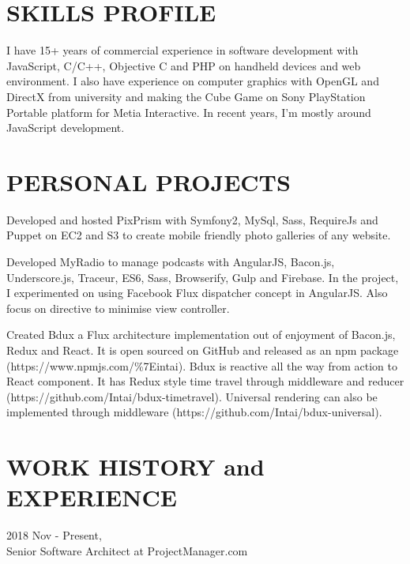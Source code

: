 \begin{resume}
\vspace{0.1in}
 
\section{SKILLS PROFILE} 
\vspace{0.1in}

I have 15+ years of commercial experience in software development with JavaScript, C/C++, Objective C and PHP on handheld devices and web environment. I also have experience on computer graphics with OpenGL and DirectX from university and making the Cube Game on Sony PlayStation Portable platform for Metia Interactive. In recent years, I'm mostly around JavaScript development.

\section{PERSONAL PROJECTS} 
\vspace{0.1in}

Developed and hosted PixPrism with Symfony2, MySql, Sass, RequireJs and Puppet on EC2 and S3 to create mobile friendly photo galleries of any website.

Developed MyRadio to manage podcasts with AngularJS, Bacon.js, Underscore.js, Traceur, ES6, Sass, Browserify, Gulp and Firebase. In the project, I experimented on using Facebook Flux dispatcher concept in AngularJS. Also focus on directive to minimise view controller.

Created Bdux a Flux architecture implementation out of enjoyment of Bacon.js, Redux and React. It is open sourced on GitHub and released as an npm package (https://www.npmjs.com/\%7Eintai). Bdux is reactive all the way from action to React component. It has Redux style time travel through middleware and reducer (https://github.com/Intai/bdux-timetravel). Universal rendering can also be implemented through middleware (https://github.com/Intai/bdux-universal).

\section{WORK HISTORY and EXPERIENCE} 
\vspace{0.15in} 

\hspace*{-0.25in} 2018 Nov - Present,\\
\hspace*{-0.25in} Senior Software Architect at ProjectManager.com


\end{resume}
